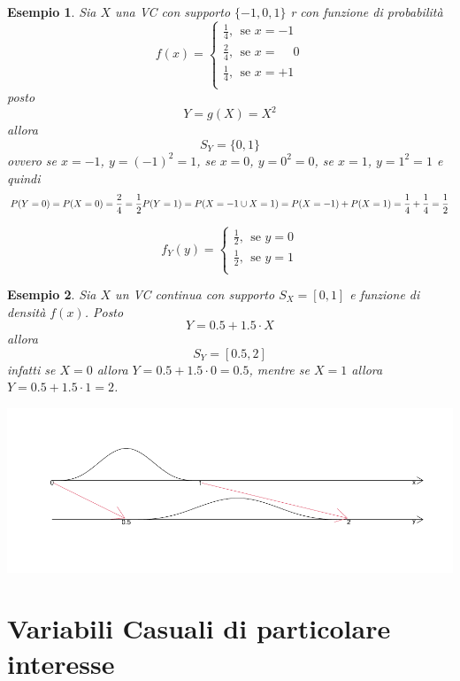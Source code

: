 \documentclass[
  11pt,
]{book}
\theoremstyle{mytheoremstyle}
\theoremstyle{mydefstyle}
\newtheorem{example}{{Esempio}}[section]
\begin{document}
\begin{example}
Sia \(X\) una VC con supporto \(\{-1,0,1\}\) r con funzione di probabilità
\[
f(x)= \begin{cases}
\frac 14,~~\text{se $x=-1$}\\
\frac 24,~~\text{se $x=\phantom-0$}\\
\frac 14,~~\text{se $x=+1$}\\
\end{cases}
\]
posto
\[
Y=g(X)= X^2
\]
allora
\[
S_Y = \{0,1\}
\]
ovvero se \(x=-1\), \(y=(-1)^2=1\), se \(x=0\), \(y=0^2=0\), se \(x=1\), \(y=1^2=1\) e quindi
\[
P(Y=0) = P(X=0) = \frac 24 = \frac 12\\
P(Y=1) = P(X=-1 \cup X = 1) = P(X=-1) + P(X = 1) = \frac 14+\frac14=\frac12
\]

\[
f_Y(y)= \begin{cases}
\frac 12,~~\text{se $y=0$}\\
\frac 12,~~\text{se $y=1$}\\
\end{cases}
\]
\end{example}

\begin{example}

Sia \(X\) un VC continua con supporto \(S_X=[0,1]\) e funzione di densità \(f(x)\). Posto
\[
Y=0.5+1.5\cdot X
\]
allora
\[
S_Y=[0.5,2]
\]
infatti se \(X=0\) allora \(Y=0.5+1.5\cdot 0=0.5\), mentre se \(X=1\) allora \(Y=0.5+1.5\cdot 1=2\).

\begin{center}\includegraphics{Appunti_di_Statistica_2025_files/figure-latex/06-beta-1} \end{center}

\end{example}

\chapter{Variabili Casuali di particolare interesse}\label{variabili-casuali-di-particolare-interesse}
\end{document}
